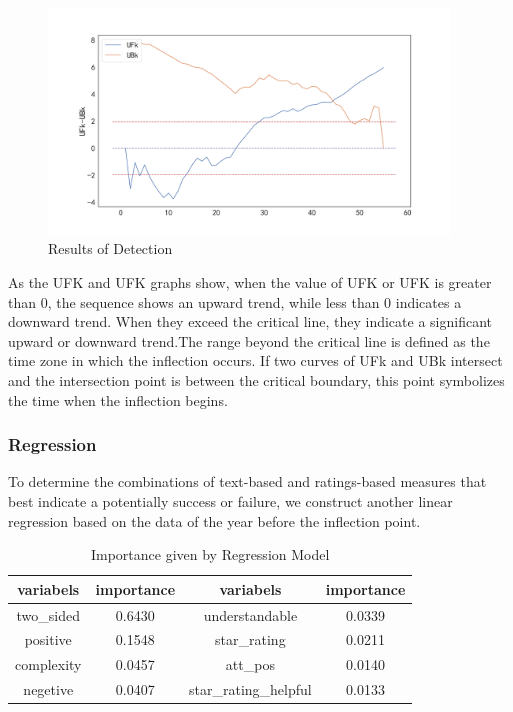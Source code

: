 \documentclass{mcmthesis}
\begin{document}
\begin{figure}[h]
\centering
\includegraphics[width=.95\textwidth,height=6cm]{figures/k.png}
\caption{Results of Detection}
\end{figure}

As the UFK and UFK graphs show, when the value of UFK or UFK is greater than 0, the sequence shows an upward trend, while less than 0 indicates a downward trend. When they exceed the critical line, they indicate a significant upward or downward trend.The range beyond the critical line is defined as the time zone in which the inflection occurs. If two curves of UFk and UBk intersect and the intersection point is between the critical boundary, this point symbolizes the time when the inflection begins.

\subsubsection{Regression}

\quad \quad To determine the combinations of text-based and ratings-based measures that best indicate a potentially success or failure, we construct another linear regression based on the data of the year before the inflection point.

\begin{longtable}[c]{cccc}
\caption{Importance given by Regression Model}\\
\toprule
variabels  &  importance & variabels  & importance\\
\midrule
\endhead
\bottomrule
\endfoot
two\_sided     & 0.6430 & understandable        & 0.0339 \\
positive       & 0.1548 & star\_rating          & 0.0211 \\
complexity     & 0.0457 & att\_pos              & 0.0140 \\
negetive       & 0.0407 & star\_rating\_helpful & 0.0133 \\
\end{longtable}
\end{document}
